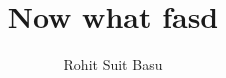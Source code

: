 \documentclass[a4paper]{article}
\begin{document}
\title{Now what fasd}
\author{Rohit Suit Basu}
\maketitle
\end{document}
